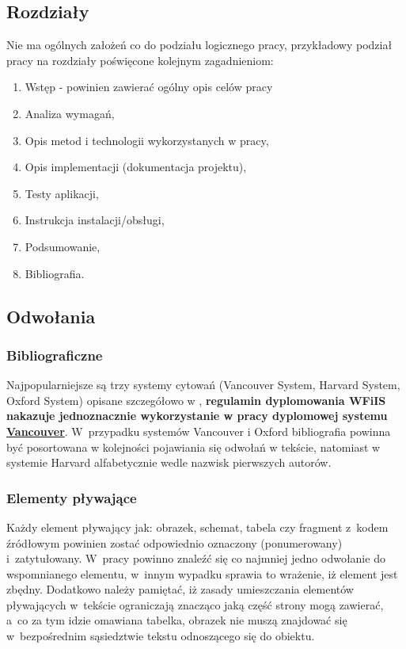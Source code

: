 \documentclass[12pt,a4paper]{article}
\begin{document}
\subsection{Rozdziały}
Nie ma ogólnych założeń co do podziału logicznego pracy, przykładowy podział pracy na rozdziały poświęcone kolejnym zagadnieniom:
\begin{enumerate}
\item Wstęp - powinien zawierać ogólny opis celów pracy
\item Analiza wymagań,
\item Opis metod i technologii wykorzystanych w pracy,
\item Opis implementacji (dokumentacja projektu),
\item Testy aplikacji,
\item Instrukcja instalacji/obsługi,
\item Podsumowanie,
\item Bibliografia.
\end{enumerate}

\subsection{Odwołania}

\subsubsection{Bibliograficzne}
Najpopularniejsze są trzy systemy cytowań (Vancouver System, Harvard System, Oxford System) opisane szczegółowo w \cite{Cytowanie}, {\bf regulamin dyplomowania WFiIS nakazuje jednoznacznie  wykorzystanie w pracy dyplomowej systemu \underline{Vancouver}}. W~przypadku systemów Vancouver i Oxford bibliografia powinna być posortowana w kolejności pojawiania się odwołań w tekście, natomiast w systemie Harvard alfabetycznie wedle nazwisk pierwszych autorów.


\subsubsection{Elementy pływające}
Każdy element pływający jak: obrazek, schemat, tabela czy fragment z~kodem źródłowym powinien zostać odpowiednio oznaczony (ponumerowany) i~zatytułowany. W~pracy powinno znaleźć się co najmniej jedno odwołanie do wspomnianego elementu, w~innym wypadku sprawia to wrażenie, iż element jest zbędny. Dodatkowo należy pamiętać, iż zasady umieszczania elementów pływających w~tekście ograniczają znacząco jaką część strony mogą zawierać, a~co za tym idzie omawiana tabelka, obrazek nie muszą znajdować się w~bezpośrednim sąsiedztwie tekstu odnoszącego się do obiektu.
\end{document}
